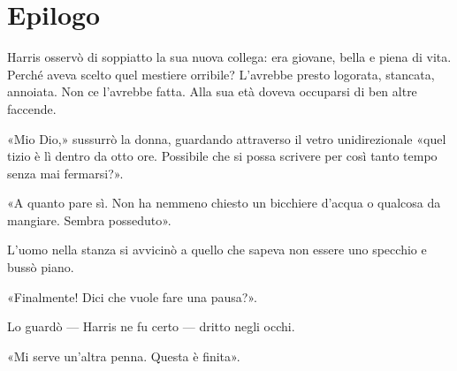 \chapter{Epilogo}
\label{ch:epilogue}

Harris osservò di soppiatto la sua nuova collega: era giovane, bella e piena di vita. Perché aveva
scelto quel mestiere orribile? L'avrebbe presto logorata, stancata, annoiata. Non ce l'avrebbe
fatta. Alla sua età doveva occuparsi di ben altre faccende.

«Mio Dio,» sussurrò la donna, guardando attraverso il vetro unidirezionale «quel tizio è lì dentro
da otto ore. Possibile che si possa scrivere per così tanto tempo senza mai fermarsi?».

«A quanto pare sì. Non ha nemmeno chiesto un bicchiere d'acqua o qualcosa da mangiare. Sembra
posseduto».

L'uomo nella stanza si avvicinò a quello che sapeva non essere uno specchio e bussò piano.

«Finalmente! Dici che vuole fare una pausa?».

Lo guardò --- Harris ne fu certo --- dritto negli occhi.

«Mi serve un'altra penna. Questa è finita».
